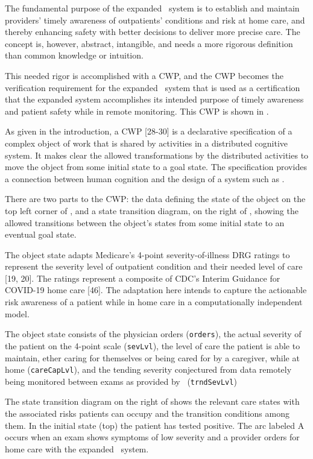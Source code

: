 The fundamental purpose of the expanded \phware\ system is to establish and maintain providers' timely awareness of outpatients' conditions and risk at home care, and thereby enhancing safety with better decisions to deliver more precise care. The concept is, however, abstract, intangible, and needs a more rigorous definition than common knowledge or intuition. 

This needed rigor is accomplished with a CWP, and the CWP becomes the verification requirement for the expanded \phware\ system that is used as a certification that the expanded system accomplishes its intended purpose of timely awareness and patient safety while in remote monitoring. This CWP is shown in . 

As given in the introduction, a CWP [28-30] is a declarative specification of a complex object of work that is shared by activities in a distributed cognitive system. It makes clear the allowed transformations by the distributed activities to move the object from some initial state to a goal state. The specification provides a connection between human cognition and the design of a system such as \phware.

There are two parts to the CWP: the data defining the state of the object on the top left corner of , and a state transition diagram, on the right of , showing the allowed transitions between the object's states from some initial state to an eventual goal state. 

The object state adapts Medicare’s 4-point severity-of-illness DRG ratings to represent the severity level of outpatient condition and their needed level of care [19, 20]. The ratings represent a composite of CDC’s Interim Guidance for COVID-19 home care [46]. The adaptation here intends to capture the actionable risk awareness of a patient while in home care in a computationally independent model. 

The object state consists of the physician orders (\texttt{orders}), the actual severity of the patient on the 4-point scale (\texttt{sevLvl}), the level of care the patient is able to maintain, ether caring for themselves or being cared for by a caregiver, while at home (\texttt{careCapLvl}), and the tending severity conjectured from data remotely being monitored between exams as provided by \phware\ (\texttt{trndSevLvl})

The state transition diagram on the right of  shows the relevant care states with the associated risks patients can occupy and the transition conditions among them. In the initial state (top) the patient has tested positive. The arc labeled A occurs when an exam shows symptoms of low severity and a provider orders for home care with the expanded \phware\ system. 

